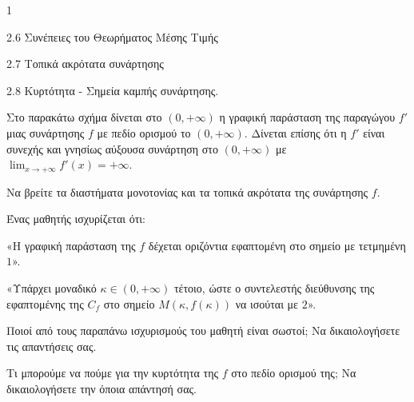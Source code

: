 \begin{ylh}{1}
    \item 2.6 Συνέπειες του Θεωρήματος Μέσης Τιμής
    \item 2.7 Τοπικά ακρότατα συνάρτησης
    \item 2.8 Κυρτότητα - Σημεία καμπής συνάρτησης.
\end{ylh}
\begin{figure} %
\centering
{}
\end{figure}
Στο παρακάτω σχήμα δίνεται στο $(0, +\infty)$ η γραφική παράσταση της παραγώγου $f'$ μιας συνάρτησης $f$ με πεδίο ορισμού το $(0, +\infty)$. Δίνεται επίσης ότι η $f'$ είναι συνεχής και γνησίως αύξουσα συνάρτηση στο $(0, +\infty)$ με $\lim_{x \to +\infty} f'(x) = +\infty$.

\begin{alist}
\item Να βρείτε τα διαστήματα μονοτονίας και τα τοπικά ακρότατα της συνάρτησης $f$. 
\item Ένας μαθητής ισχυρίζεται ότι:
    \begin{rlist}
    \item «Η γραφική παράσταση της $f$ δέχεται οριζόντια εφαπτομένη στο σημείο με τετμημένη $1$».
    \item «Υπάρχει μοναδικό $\kappa \in (0, +\infty)$ τέτοιο, ώστε ο συντελεστής διεύθυνσης της εφαπτομένης της $C_f$ στο σημείο $M(\kappa, f(\kappa))$ να ισούται με $2$».
    \end{rlist}
    Ποιοί από τους παραπάνω ισχυρισμούς του μαθητή είναι σωστοί; Να δικαιολογήσετε τις απαντήσεις σας. 
\item Τι μπορούμε να πούμε για την κυρτότητα της $f$ στο πεδίο ορισμού της; Να δικαιολογήσετε την όποια απάντησή σας. 
\end{alist}